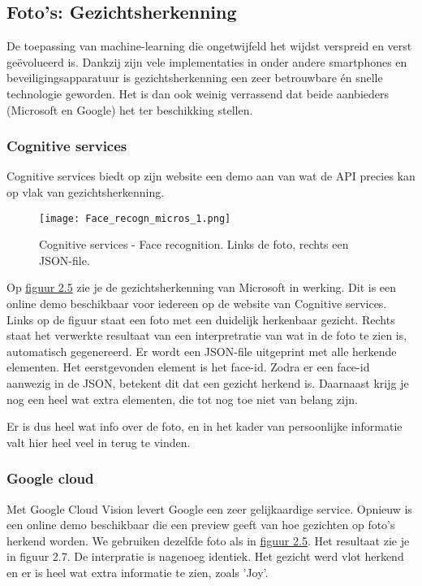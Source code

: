 \subsection{Foto's: Gezichtsherkenning}
De toepassing van machine-learning die ongetwijfeld het wijdst verspreid en verst geëvolueerd is. Dankzij zijn vele implementaties in onder andere smartphones en beveiligingsapparatuur is gezichtsherkenning een zeer betrouwbare én snelle technologie geworden. Het is dan ook weinig verrassend dat beide aanbieders (Microsoft en Google) het ter beschikking stellen. 

\subsubsection{Cognitive services}
Cognitive services biedt op zijn website een demo aan van wat de API precies kan op vlak van gezichtsherkenning.   


\begin{figure}[h]
    \texttt{[image: Face\_recogn\_micros\_1.png]}
    \caption{Cognitive services - Face recognition. Links de foto, rechts een JSON-file.}
    \label{fig:cognitive}
\end{figure}

Op \hyperref[fig:cognitive]{figuur 2.5} zie je de gezichtsherkenning van Microsoft in werking. Dit is een online demo beschikbaar voor iedereen op de website van Cognitive services. Links op de figuur staat een foto met een duidelijk herkenbaar gezicht. Rechts staat het verwerkte resultaat van een interpretratie van wat in de foto te zien is, automatisch gegenereerd. Er wordt een JSON-file uitgeprint met alle herkende elementen. Het eerstgevonden element is het face-id. Zodra er een face-id aanwezig in de JSON, betekent dit dat een gezicht herkend is. Daarnaast krijg je nog een heel wat extra elementen, die tot nog toe niet van belang zijn. 

Er is dus heel wat info over de foto, en in het kader van persoonlijke informatie valt hier heel veel in terug te vinden. 

\subsubsection{Google cloud}
Met Google Cloud Vision levert Google een zeer gelijkaardige service. Opnieuw is een online demo beschikbaar die een preview geeft van hoe gezichten op foto's herkend worden. We gebruiken dezelfde foto als in \hyperref[fig:cognitive2]{figuur 2.5}. Het resultaat zie je in figuur 2.7. De interpratie is nagenoeg identiek. Het gezicht werd vlot herkend en er is heel wat extra informatie te zien, zoals 'Joy'. 

